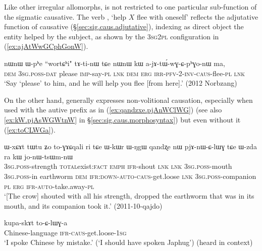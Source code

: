 Like other irregular allomorphs,  is not restricted to one particular sub-func\-tion of the sigmatic causative. The verb , `help $X$ flee with oneself' reflects the adjutative function of causative (§\ref{sec:sig.caus.adjutative}), indexing as direct object the entity helped by the subject, as shown by the \textsc{3sg}\fl{}\textsc{2pl} configuration in (\ref{ex:ajAtWwGCphGonW}).

\begin{exe}
\ex \label{ex:ajAtWwGCphGonW}
\gll nɯnɯ ɯ-pʰe ``wortɕʰi" tɤ-ti-nɯ tɕe nɯnɯ kɯ a-jɤ-tɯ́-wɣ-ɕ-pʰɣo-nɯ ma, \\
\textsc{dem} \textsc{3sg}.\textsc{poss}-\textsc{dat} please \textsc{imp}-say-\textsc{pl} \textsc{lnk} \textsc{dem} \textsc{erg} \textsc{irr}-\textsc{pfv}-2-\textsc{inv}-\textsc{caus}-flee-\textsc{pl} \textsc{lnk} \\
\glt `Say `please' to him, and he will help you flee [from here].' (2012 Norbzang)
\end{exe}

On the other hand,  generally expresses non-volitional causation, especially when used with the autive prefix as in (\ref{ex:qandzxe.pjAnWClWG}) (see also \ref{ex:kW.pjAsWGWtnW} in §\ref{sec:sig.caus.morphosyntax}) but even without it (\ref{ex:toCLWGa}).

\begin{exe}
\ex \label{ex:qandzxe.pjAnWClWG}
\gll ɯ-xɕɤt tɯ\redp{}tu ʑo to-ɣɤɕqali ri tɕe ɯ-kɯr ɯ-ŋgɯ qandʐe nɯ pjɤ-nɯ-ɕ-lɯɣ tɕe ɯ-zda ra kɯ jo-nɯ-tsɯm-nɯ \\
\textsc{3sg}.\textsc{poss}-strength \textsc{total}\redp{}exist:\textsc{fact} \textsc{emph} \textsc{ifr}-shout \textsc{lnk} \textsc{lnk} \textsc{3sg}.\textsc{poss}-mouth \textsc{3sg}.\textsc{poss}-in earthworm \textsc{dem} \textsc{ifr}:\textsc{down}-\textsc{auto}-\textsc{caus}-get.loose \textsc{lnk} \textsc{3sg}.\textsc{poss}-companion \textsc{pl} \textsc{erg} \textsc{ifr}-\textsc{auto}-take.away-\textsc{pl} \\
\glt `[The crow] shouted with all his strength, dropped the earthworm that was in its mouth, and its companion took it.' (2011-10-qajdo)
\end{exe}

\begin{exe}
\ex \label{ex:toCLWGa}
\gll kupa-skɤt to-ɕ-lɯɣ-a \\
Chinese-language \textsc{ifr}-\textsc{caus}-get.loose-\textsc{1sg} \\
\glt `I spoke Chinese by mistake.' (`I should have spoken Japhug') (heard in context)
\end{exe}

